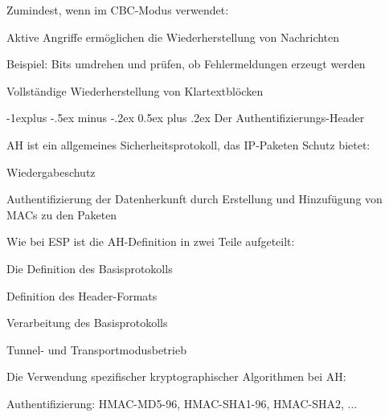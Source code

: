 \documentclass[a4paper]{article}
\makeatletter
\renewcommand{\subsection}{\@startsection{subsection}{2}{0mm}%
 {-1explus -.5ex minus -.2ex}%
 {0.5ex plus .2ex}%
 {\normalfont\normalsize\bfseries}}
\makeatother
\begin{document}
\begin{multicols}{3}
\begin{itemize*}
\begin{itemize*}
                  \item Zumindest, wenn im CBC-Modus verwendet:
                  \begin{itemize*}
                        \item Aktive Angriffe ermöglichen die Wiederherstellung von Nachrichten
                        \item Beispiel: Bits umdrehen und prüfen, ob Fehlermeldungen erzeugt werden
                        \item Vollständige Wiederherstellung von Klartextblöcken
                  \end{itemize*}
            \end{itemize*}
      \end{itemize*}

      \subsection{Der Authentifizierungs-Header}
      \begin{itemize*}
            \item AH ist ein allgemeines Sicherheitsprotokoll, das IP-Paketen Schutz bietet:
            \begin{itemize*}
                  \item Wiedergabeschutz
                  \item Authentifizierung der Datenherkunft durch Erstellung und Hinzufügung von MACs zu den Paketen
            \end{itemize*}
            \item Wie bei ESP ist die AH-Definition in zwei Teile aufgeteilt:
            \begin{itemize*}
                  \item Die Definition des Basisprotokolls
                  \begin{itemize*}
                        \item Definition des Header-Formats
                        \item Verarbeitung des Basisprotokolls
                        \item Tunnel- und Transportmodusbetrieb
                  \end{itemize*}
                  \item Die Verwendung spezifischer kryptographischer Algorithmen bei AH:
                  \begin{itemize*}
                        \item Authentifizierung: HMAC-MD5-96, HMAC-SHA1-96, HMAC-SHA2, ...

\end{itemize*}
\end{itemize*}
\end{itemize*}
\end{multicols}
\end{document}
